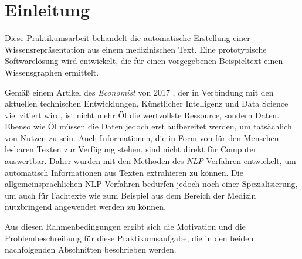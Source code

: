 \renewcommand{\chaptermark}[1]{\markboth{\spacedlowsmallcaps{#1}}{\spacedlowsmallcaps{#1}}}
\renewcommand{\sectionmark}[1]{\markright{\thesection\enspace\spacedlowsmallcaps{#1}}}

\chapter{Einleitung}

Diese Praktikumsarbeit behandelt die automatische Erstellung einer Wissensrepräsentation aus einem medizinischen Text. Eine prototypische Softwarelösung wird entwickelt, die für einen vorgegebenen Beispieltext einen Wissensgraphen ermittelt.

Gemäß einem Artikel des \emph{Economist} von 2017 \cite{the_economist_worlds_2017}, der in Verbindung mit den aktuellen technischen Entwicklungen, Künstlicher Intelligenz und Data Science viel zitiert wird, ist nicht mehr Öl die wertvollste Ressource, sondern Daten. Ebenso wie Öl müssen die Daten jedoch erst aufbereitet werden, um tatsächlich von Nutzen zu sein. Auch Informationen, die in Form von für den Menschen lesbaren Texten zur Verfügung stehen, sind nicht direkt für Computer auswertbar. Daher wurden mit den Methoden des \emph{\ac{NLP}} Verfahren entwickelt, um automatisch Informationen aus Texten extrahieren zu können. Die allgemeinsprachlichen NLP-Verfahren bedürfen jedoch noch einer Spezialisierung, um auch für Fachtexte wie zum Beispiel aus dem Bereich der Medizin nutzbringend angewendet werden zu können.

Aus diesen Rahmenbedingungen ergibt sich die Motivation und die Problembeschreibung für diese Praktikumsaufgabe, die in den beiden nachfolgenden Abschnitten beschrieben werden.